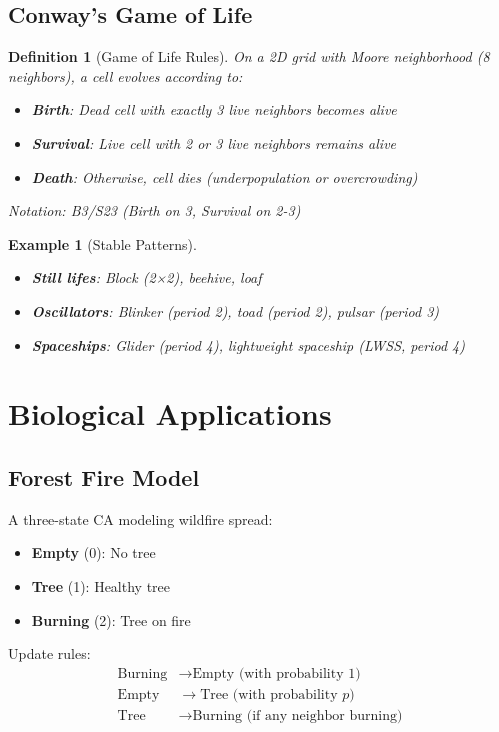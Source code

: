 \documentclass[a4paper, 11pt]{article}
\newtheorem{definition}{Definition}[section]
\newtheorem{example}{Example}[section]
\begin{document}
\subsection{Conway's Game of Life}

\begin{definition}[Game of Life Rules]
On a 2D grid with Moore neighborhood (8 neighbors), a cell evolves according to:
\begin{itemize}
\item \textbf{Birth}: Dead cell with exactly 3 live neighbors becomes alive
\item \textbf{Survival}: Live cell with 2 or 3 live neighbors remains alive
\item \textbf{Death}: Otherwise, cell dies (underpopulation or overcrowding)
\end{itemize}
Notation: B3/S23 (Birth on 3, Survival on 2-3)
\end{definition}

\begin{example}[Stable Patterns]
\begin{itemize}
\item \textbf{Still lifes}: Block (2×2), beehive, loaf
\item \textbf{Oscillators}: Blinker (period 2), toad (period 2), pulsar (period 3)
\item \textbf{Spaceships}: Glider (period 4), lightweight spaceship (LWSS, period 4)
\end{itemize}
\end{example}

\section{Biological Applications}

\subsection{Forest Fire Model}

A three-state CA modeling wildfire spread:
\begin{itemize}
\item \textbf{Empty} (0): No tree
\item \textbf{Tree} (1): Healthy tree
\item \textbf{Burning} (2): Tree on fire
\end{itemize}

Update rules:
\begin{align}
\text{Burning} &\to \text{Empty (with probability 1)} \\
\text{Empty} &\to \text{Tree (with probability } p) \\
\text{Tree} &\to \text{Burning (if any neighbor burning)}
\end{align}
\end{document}
